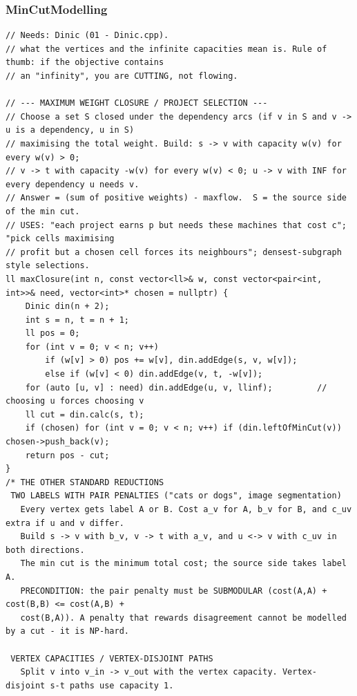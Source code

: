 \documentclass[9pt,a4paper,twocolumn]{extarticle}
\begin{document}
\filbreak
\subsubsection{MinCutModelling}
\nopagebreak
\begin{lstlisting}
// Needs: Dinic (01 - Dinic.cpp).
// what the vertices and the infinite capacities mean is. Rule of thumb: if the objective contains
// an "infinity", you are CUTTING, not flowing.

// --- MAXIMUM WEIGHT CLOSURE / PROJECT SELECTION ---
// Choose a set S closed under the dependency arcs (if v in S and v -> u is a dependency, u in S)
// maximising the total weight. Build: s -> v with capacity w(v) for every w(v) > 0;
// v -> t with capacity -w(v) for every w(v) < 0; u -> v with INF for every dependency u needs v.
// Answer = (sum of positive weights) - maxflow.  S = the source side of the min cut.
// USES: "each project earns p but needs these machines that cost c"; "pick cells maximising
// profit but a chosen cell forces its neighbours"; densest-subgraph style selections.
ll maxClosure(int n, const vector<ll>& w, const vector<pair<int, int>>& need, vector<int>* chosen = nullptr) {
    Dinic din(n + 2);
    int s = n, t = n + 1;
    ll pos = 0;
    for (int v = 0; v < n; v++)
        if (w[v] > 0) pos += w[v], din.addEdge(s, v, w[v]);
        else if (w[v] < 0) din.addEdge(v, t, -w[v]);
    for (auto [u, v] : need) din.addEdge(u, v, llinf);         // choosing u forces choosing v
    ll cut = din.calc(s, t);
    if (chosen) for (int v = 0; v < n; v++) if (din.leftOfMinCut(v)) chosen->push_back(v);
    return pos - cut;
}
/* THE OTHER STANDARD REDUCTIONS
 TWO LABELS WITH PAIR PENALTIES ("cats or dogs", image segmentation)
   Every vertex gets label A or B. Cost a_v for A, b_v for B, and c_uv extra if u and v differ.
   Build s -> v with b_v, v -> t with a_v, and u <-> v with c_uv in both directions.
   The min cut is the minimum total cost; the source side takes label A.
   PRECONDITION: the pair penalty must be SUBMODULAR (cost(A,A) + cost(B,B) <= cost(A,B) +
   cost(B,A)). A penalty that rewards disagreement cannot be modelled by a cut - it is NP-hard.

 VERTEX CAPACITIES / VERTEX-DISJOINT PATHS
   Split v into v_in -> v_out with the vertex capacity. Vertex-disjoint s-t paths use capacity 1.


\end{lstlisting}
\end{document}
